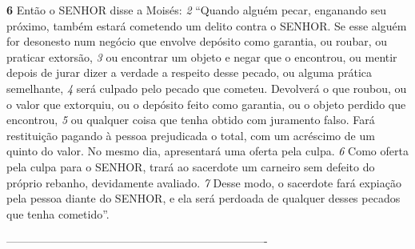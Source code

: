 \smallskip
\textbf{\large 6} Então o SENHOR disse a Moisés: 
\textit{\tiny 2} 
“Quando alguém pecar, enganando seu
próximo, também estará cometendo um delito contra o SENHOR. Se esse alguém
for desonesto num negócio que envolve depósito como garantia, ou roubar, ou
praticar extorsão, 
\textit{\tiny 3} 
ou encontrar um objeto e negar que o encontrou, ou mentir
depois de jurar dizer a verdade a respeito desse pecado, ou alguma prática
semelhante, 
\textit{\tiny 4} 
será culpado pelo pecado que cometeu. Devolverá o que roubou, ou
o valor que extorquiu, ou o depósito feito como garantia, ou o objeto perdido que
encontrou, 
\textit{\tiny 5} 
ou qualquer coisa que tenha obtido com juramento falso. Fará
restituição pagando à pessoa prejudicada o total, com um acréscimo de um
quinto do valor. No mesmo dia, apresentará uma oferta pela culpa. 
\textit{\tiny 6} 
Como oferta
pela culpa para o SENHOR, trará ao sacerdote um carneiro sem defeito do próprio
rebanho, devidamente avaliado. 
\textit{\tiny 7} 
Desse modo, o sacerdote fará expiação pela
pessoa diante do SENHOR, e ela será perdoada de qualquer desses pecados que
tenha cometido”.



----------------------------------------------------------------------
